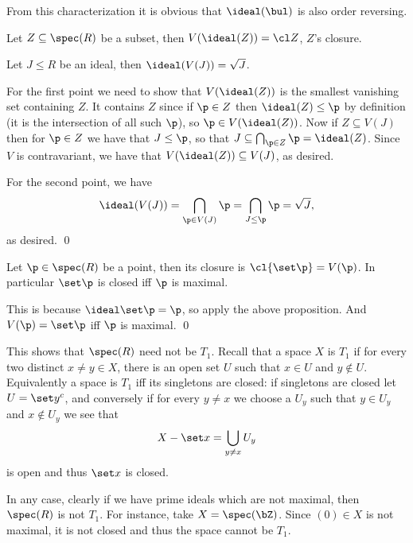 From this characterization it is obvious that $\ideal(\bul)$ is also order reversing.

\bprop

    \benum
        \item Let $Z\subseteq\spec(R)$ be a subset, then $V(\ideal(Z))=\cl Z$, $Z$'s closure.
        \item Let $J\leq R$ be an ideal, then $\ideal(V(J))=\sqrt J$.
    \eenum

\eprop

\bproof

    For the first point we need to show that $V(\ideal(Z))$ is the smallest vanishing set containing $Z$.
    It contains $Z$ since if $\p\in Z$ then $\ideal(Z)\leq\p$ by definition (it is the intersection of all such $\p$), so $\p\in V(\ideal(Z))$.
    Now if $Z\subseteq V(J)$ then for $\p\in Z$ we have that $J\leq\p$, so that $J\subseteq\bigcap_{\p\in Z}\p=\ideal(Z)$.
    Since $V$ is contravariant, we have that $V(\ideal(Z))\subseteq V(J)$, as desired.

    For the second point, we have
    $$ \ideal(V(J)) = \bigcap_{\p\in V(J)}\p = \bigcap_{J\leq\p}\p = \sqrt J, $$
    as desired.
    \qed

\eproof

\bcoro

    Let $\p\in\spec(R)$ be a point, then its closure is $\cl{\set\p}=V(\p)$.
    In particular $\set\p$ is closed iff $\p$ is maximal.

\ecoro

\bproof

    This is because $\ideal\set\p=\p$, so apply the above proposition.
    And $V(\p)=\set\p$ iff $\p$ is maximal.
    \qed

\eproof

\bexam

    This shows that $\spec(R)$ need not be $T_1$.
    Recall that a space $X$ is $T_1$ if for every two distinct $x\neq y\in X$, there is an open set $U$ such that $x\in U$ and $y\notin U$.
    Equivalently a space is $T_1$ iff its singletons are closed: if singletons are closed let $U=\set y^c$, and conversely if for every $y\neq x$ we choose a
    $U_y$ such that $y\in U_y$ and $x\notin U_y$ we see that
    $$ X-\set x = \bigcup_{y\neq x}U_y $$
    is open and thus $\set x$ is closed.

    In any case, clearly if we have prime ideals which are not maximal, then $\spec(R)$ is not $T_1$.
    For instance, take $X=\spec(\bZ)$.
    Since $(0)\in X$ is not maximal, it is not closed and thus the space cannot be $T_1$.

